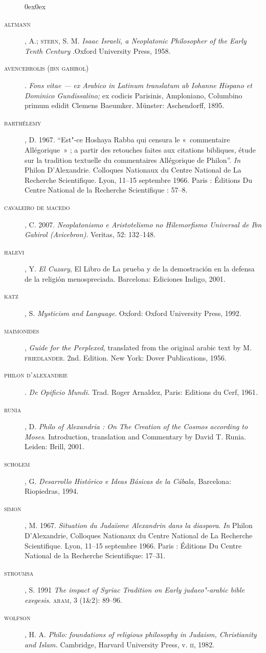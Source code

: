 \begin{description}0ex\parsep0ex
\newcommand{\tit}[1]{\item[\textnormal{\textsc{\MakeTextLowercase{#1}}}]}
\newcommand{\titidem}{\item[\line(1,0){25}]}
\tit{ALTMANN}, A.; \textsc{stern}, S. M. \emph{Isaac Israeli, a Neoplatonic
Philosopher of the Early Tenth Century} .Oxford University Press,
1958.

\tit{AVENCEBROLIS (IBN GABIROL)}. \emph{Fons vitae ---} \emph{ex Arabico
in
Latinum translatum ab Iohanne Hispano et Dominico Gundissalino;} ex
codicis Parisinis, Amploniano, Columbino primum edidit Clemens
Baeumker. Münster: Aschendorff, 1895.

\tit{BARTHÉLEMY}, D. 1967. ``Est"-ce Hoshaya Rabba qui censura le
«~commentaire Allégorique~» ; a partir des retouches faites aux
citations bibliques, étude sur la tradition textuelle du
commentaires
Allégorique de Philon''. \emph{In} Philon D'Alexandrie. Colloques
Nationaux du Centre National de La Recherche Scientifique. Lyon,
11--15 septembre 1966. Paris : Éditions Du Centre National de la
Recherche Scientifique : 57--8.

\tit{CAVALEIRO DE MACEDO}, C. 2007. \emph{Neoplatonismo e Aristotelismo
no
Hilemorfismo Universal de Ibn Gabirol (Avicebron)}. Veritas, 52:
132--148.

\tit{HALEVI}, Y. \emph{El Cuzary},  El Libro de La prueba y de la
demostración en la defensa de la religión menospreciada. Barcelona:
Ediciones Indigo, 2001.

\tit{KATZ}, S. \emph{Mysticism and Language}. Oxford: Oxford University
Press, 1992.

\tit{MAIMONIDES}, \emph{Guide for the Perplexed}, translated from the
original arabic text by M. \textsc{friedlander}. 2nd. Edition. New York:
Dover
Publications, 1956.

\tit{PHILON D'ALEXANDRIE}.\emph{ De Opificio Mundi.} Trad. Roger
Arnaldez,
Paris: Editions du Cerf, 1961\emph{.} 

\tit{RUNIA}, D. \emph{Philo of Alexandria : On The Creation of the
Cosmos
according to Moses}. Introduction, translation and Commentary by
David T. Runia. Leiden: Brill, 2001.

\tit{SCHOLEM}, G. \emph{Desarrollo Histórico e Ideas Básicas de la
Cábala}\emph{,} Barcelona: Riopiedras, 1994.

\tit{SIMON}, M. 1967. \emph{Situation du Ju}\emph{daïsme Alexandrin
dans
la diaspora}. \emph{In} Philon D'Alexandrie, Colloques Nationaux
du
Centre National de La Recherche Scientifique. Lyon, 11--15 septembre
1966. Paris : Éditions Du Centre National de la Recherche
Scientifique: 17--31.

\tit{STROUMSA}, S. 1991 \emph{The impact of Syriac Tradition on Early
judaeo"-arabic bible exegesis}. \textsc{aram}, 3 (1\&2): 89--96. 

\tit{WOLFSON}, H. A. \emph{P}\emph{hilo:} \emph{foundations of
religious philosophy in Judaism, Christianity and Islam.} Cambridge,
Harvard University Press, v. \textsc{ii}, 1982.
\end{description}



